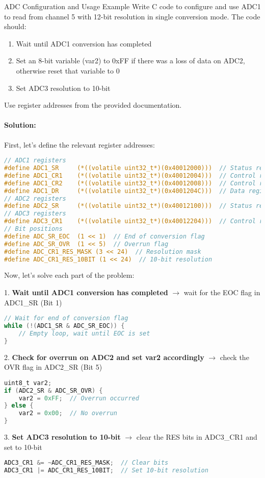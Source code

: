 \begin{example2}{ADC Configuration and Usage Example}
Write C code to configure and use ADC1 to read from channel 5 with 12-bit resolution in single conversion mode. The code should:

\begin{enumerate}
    \item Wait until ADC1 conversion has completed
    \item Set an 8-bit variable (var2) to 0xFF if there was a loss of data on ADC2, otherwise reset that variable to 0
    \item Set ADC3 resolution to 10-bit
\end{enumerate}

Use register addresses from the provided documentation.

\paragraph{Solution:}
First, let's define the relevant register addresses:
\begin{lstlisting}[language=C, style=basesmol]
// ADC1 registers
#define ADC1_SR     (*((volatile uint32_t*)(0x40012000)))  // Status register
#define ADC1_CR1    (*((volatile uint32_t*)(0x40012004)))  // Control register 1
#define ADC1_CR2    (*((volatile uint32_t*)(0x40012008)))  // Control register 2
#define ADC1_DR     (*((volatile uint32_t*)(0x4001204C)))  // Data register
// ADC2 registers
#define ADC2_SR     (*((volatile uint32_t*)(0x40012100)))  // Status register
// ADC3 registers
#define ADC3_CR1    (*((volatile uint32_t*)(0x40012204)))  // Control register 1
// Bit positions
#define ADC_SR_EOC  (1 << 1)  // End of conversion flag
#define ADC_SR_OVR  (1 << 5)  // Overrun flag
#define ADC_CR1_RES_MASK (3 << 24)  // Resolution mask
#define ADC_CR1_RES_10BIT (1 << 24)  // 10-bit resolution
\end{lstlisting}

Now, let's solve each part of the problem:

1. \textbf{Wait until ADC1 conversion has completed} $\rightarrow$ wait for the EOC flag in ADC1\_SR (Bit 1)
\begin{lstlisting}[language=C, style=basesmol]
// Wait for end of conversion flag
while (!(ADC1_SR & ADC_SR_EOC)) {
    // Empty loop, wait until EOC is set
}
\end{lstlisting}

2. \textbf{Check for overrun on ADC2 and set var2 accordingly} $\rightarrow$ check the OVR flag in ADC2\_SR (Bit 5)
\begin{lstlisting}[language=C, style=basesmol]
uint8_t var2;
if (ADC2_SR & ADC_SR_OVR) {
    var2 = 0xFF;  // Overrun occurred
} else {
    var2 = 0x00;  // No overrun
}
\end{lstlisting}

3. \textbf{Set ADC3 resolution to 10-bit} $\rightarrow$ clear the RES bits in ADC3\_CR1 and set to 10-bit
\begin{lstlisting}[language=C, style=basesmol]
ADC3_CR1 &= ~ADC_CR1_RES_MASK;  // Clear bits
ADC3_CR1 |= ADC_CR1_RES_10BIT;  // Set 10-bit resolution
\end{lstlisting}
\end{example2}

